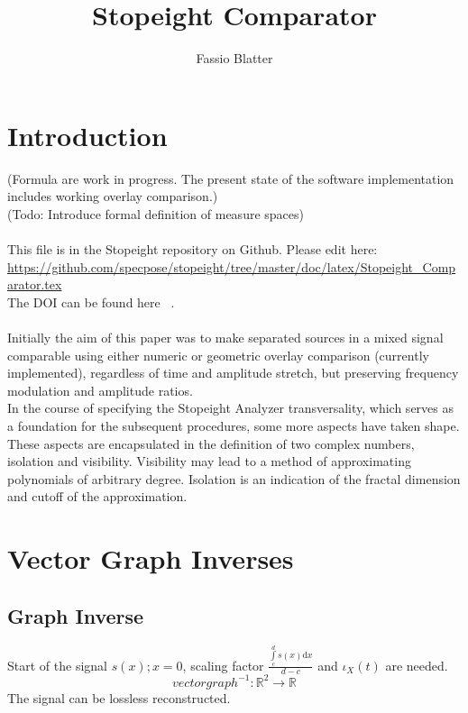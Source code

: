 \documentclass{report}
\begin{document}
\title{Stopeight Comparator}
\author{Fassio Blatter}
\maketitle

\chapter{Introduction}
(Formula are work in progress. The present state of the software implementation includes working overlay comparison.)\\
(Todo: Introduce formal definition of measure spaces)\\\\
This file is in the Stopeight repository on Github. Please edit here:\\
\href{https://github.com/specpose/stopeight/tree/master/doc/latex/Stopeight\_Comparator.tex}{https://github.com/specpose/stopeight/tree/master/doc/latex/Stopeight\_Comparator.tex}\\
The DOI can be found here ~\cite{Stopeight}.\\\\
Initially the aim of this paper was to make separated sources in a mixed signal comparable using either numeric or geometric overlay comparison (currently implemented), regardless of time and amplitude stretch, but preserving frequency modulation and amplitude ratios.\\
In the course of specifying the Stopeight Analyzer transversality, which serves as a foundation for the subsequent procedures, some more aspects have taken shape. These aspects are encapsulated in the definition of two complex numbers, isolation and visibility. Visibility may lead to a method of approximating polynomials of arbitrary degree. Isolation is an indication of the fractal dimension and cutoff of the approximation.

\chapter{Vector Graph Inverses}
\section{Graph Inverse}
Start of the signal $s(x);x=0$, scaling factor $\frac{\int \limits _{c}^{d}s(x)\mathrm{d}x}{d-c}$ and $\iota_{X}(t)$ are needed.
\begin{equation}
vectorgraph^{-1}: \mathbb{R}^2 \rightarrow \mathbb{R}
\end{equation}
The signal can be lossless reconstructed.
\end{document}
